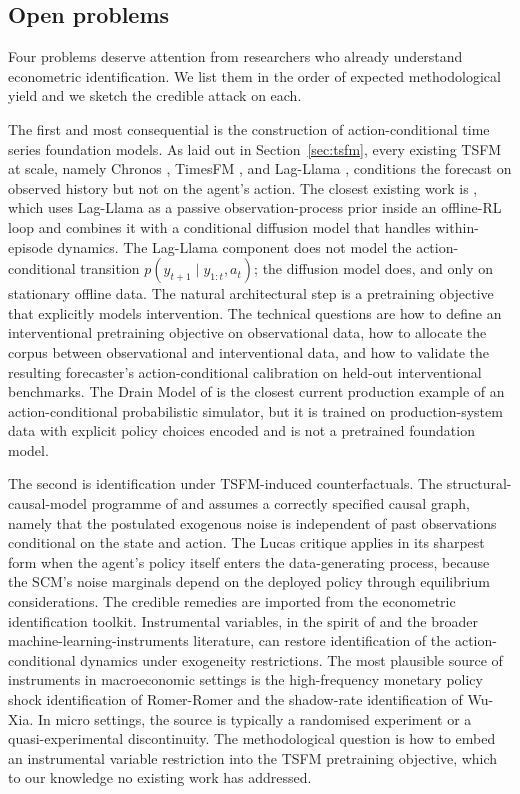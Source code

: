 \subsection{Open problems}
\label{sec:forecasting_rl_open}

Four problems deserve attention from researchers who already understand
econometric identification. We list them in the order of expected
methodological yield and we sketch the credible attack on each.

The first and most consequential is the construction of action-conditional
time series foundation models. As laid out in Section~\ref{sec:tsfm}, every
existing TSFM at scale, namely Chronos \citep{Ansari2024},
TimesFM \citep{Das2024}, and Lag-Llama \citep{Rasul2023}, conditions the
forecast on observed history but not on the agent's action. The
closest existing work is \citet{Ada2025}, which uses Lag-Llama as a
passive observation-process prior inside an offline-RL loop and combines it
with a conditional diffusion model that handles within-episode dynamics. The
Lag-Llama component does not model the action-conditional transition
$p(y_{t+1} \mid y_{1:t}, a_t)$; the diffusion model does, and only on
stationary offline data. The natural architectural step is a pretraining
objective that explicitly models intervention. The technical questions are
how to define an interventional pretraining objective on observational
data, how to allocate the corpus between observational and interventional
data, and how to validate the resulting forecaster's action-conditional
calibration on held-out interventional benchmarks. The Drain Model of
\citet{Amazon2025} is the closest current production example of an
action-conditional probabilistic simulator, but it is trained on
production-system data with explicit policy choices encoded and is not a
pretrained foundation model.

The second is identification under TSFM-induced counterfactuals. The
structural-causal-model programme of \citet{Buesing2019} and
\citet{Oberst2019} assumes a correctly specified causal graph, namely that
the postulated exogenous noise is independent of past observations
conditional on the state and action. The Lucas critique applies in
its sharpest form when the agent's policy itself enters the data-generating
process, because the SCM's noise marginals depend on the deployed policy
through equilibrium considerations. The credible remedies are imported from
the econometric identification toolkit. Instrumental variables, in the
spirit of \citet{Chernozhukov2018} and the broader
machine-learning-instruments literature, can restore identification of the
action-conditional dynamics under exogeneity restrictions. The most
plausible source of instruments in macroeconomic settings is the
high-frequency monetary policy shock identification of Romer-Romer and the
shadow-rate identification of Wu-Xia. In micro settings, the source is
typically a randomised experiment or a quasi-experimental discontinuity.
The methodological question is how to embed an instrumental variable
restriction into the TSFM pretraining objective, which to our knowledge no
existing work has addressed.

